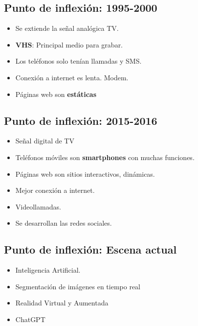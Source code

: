 \documentclass[11pt,a4paper]{article}
\begin{document}
	\subsection{Punto de inflexión: 1995-2000}
	
	\begin{itemize}[]
		\item Se extiende la señal analógica TV.
		\item \textbf{VHS}: Principal medio para grabar.
		\item Los teléfonos solo tenían llamadas y SMS.
		\item Conexión a internet es lenta. Modem.
		\item Páginas web son \textbf{estáticas}
	\end{itemize}
	
	\subsection{Punto de inflexión: 2015-2016}

	\begin{itemize}[]
		\item Señal digital de TV
		\item Teléfonos móviles son \textbf{smartphones} con muchas funciones.
		\item Páginas web son sitios interactivos, dinámicas.
		\item Mejor conexión a internet.
		\item Videollamadas.
		\item Se desarrollan las redes sociales.
	\end{itemize}
	
	\subsection{Punto de inflexión: Escena actual}

	\begin{itemize}[]
		\item Inteligencia Artificial.
		\item Segmentación de imágenes en tiempo real
		\item Realidad Virtual y Aumentada
		\item ChatGPT
	\end{itemize}
\end{document}
